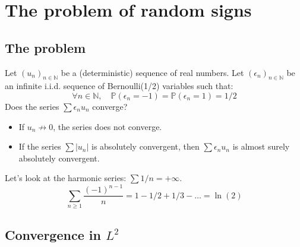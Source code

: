 \chapter{The problem of random signs}%
\sloppy%
\section{The problem}%
Let $(u_n)_{n \in \mathbb{N}}$ be a (deterministic) sequence of real numbers.
Let $(\epsilon_n)_{n \in \mathbb{N}}$ be an infinite i.i.d. sequence of Bernoulli(1/2) variables such that:
\[ \forall n \in \mathbb{N}, \quad \mathbb{P}(\epsilon_n = -1) = \mathbb{P}(\epsilon_n = 1) = 1/2 \]
Does the series $\sum \epsilon_n u_n$ converge?%
\begin{itemize}
    \item If $u_n \not\to 0$, the series does not converge.
    \item If the series $\sum |u_n|$ is absolutely convergent, then $\sum \epsilon_n u_n$ is almost surely absolutely convergent.
\end{itemize}%
Let's look at the harmonic series: $\sum 1/n = +\infty$.
\[ \sum_{n \ge 1} \frac{(-1)^{n-1}}{n} = 1 - 1/2 + 1/3 - \dots = \ln(2) \]%
\section{Convergence in $L^2$}%

